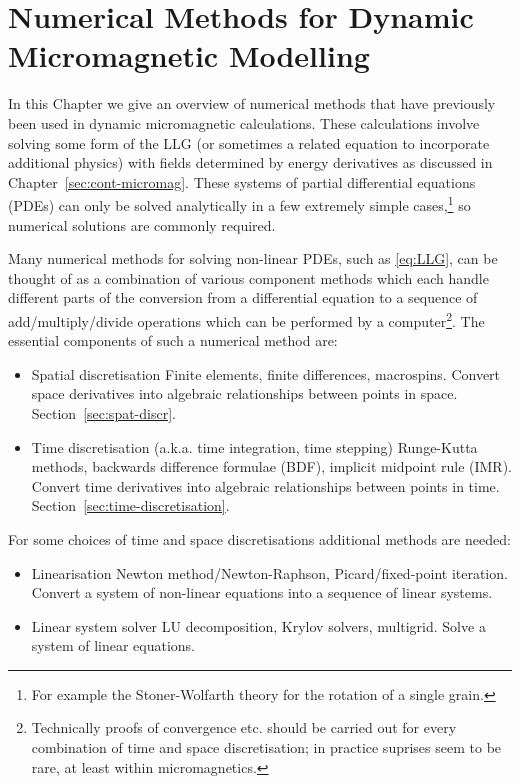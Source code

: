 \chapter{Numerical Methods for Dynamic Micromagnetic Modelling}
\label{sec:numer-meth-micr}

In this Chapter we give an overview of numerical methods that have previously been used in dynamic micromagnetic calculations.
These calculations involve solving some form of the LLG (or sometimes a related equation to incorporate additional physics) with fields determined by energy derivatives as discussed in Chapter~\ref{sec:cont-micromag}.
These systems of partial differential equations (PDEs) can only be solved analytically in a few extremely simple cases,\footnote{For example the Stoner-Wolfarth theory for the rotation of a single grain.\cite{Stoner1948a}}\cite{Aharoni1996} so numerical solutions are commonly required.

Many numerical methods for solving non-linear PDEs, such as \eqref{eq:LLG}, can be thought of as a combination of various component methods which each handle different parts of the conversion from a differential equation to a sequence of add/multiply/divide operations which can be performed by a computer\footnote{Technically proofs of convergence etc. should be carried out for every combination of time and space discretisation\cite[pg. 382]{Iserles2009}; in practice suprises seem to be rare, at least within micromagnetics.}.
The essential components of such a numerical method are:

\begin{itemize}
\item Spatial discretisation \eg Finite elements, finite differences, macrospins. Convert space derivatives into algebraic relationships between points in space. Section~\ref{sec:spat-discr}.

\item Time discretisation (a.k.a. time integration, time stepping) \eg Runge-Kutta methods, backwards difference formulae (BDF), implicit midpoint rule (IMR). Convert time derivatives into algebraic relationships between points in time. Section~\ref{sec:time-discretisation}.
\end{itemize}

For some choices of time and space discretisations additional methods are needed:
\begin{itemize}
\item Linearisation \eg Newton method/Newton-Raphson, Picard/fixed-point iteration. Convert a system of non-linear equations into a sequence of linear systems.
\item Linear system solver \eg LU decomposition, Krylov solvers, multigrid. Solve a system of linear equations.
\end{itemize}

